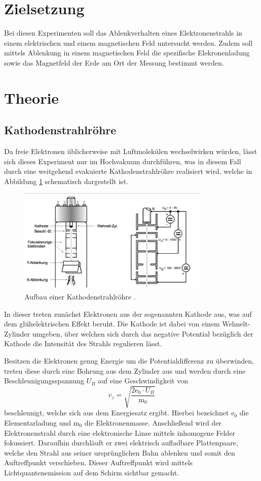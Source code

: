 \section{Zielsetzung}
Bei diesen Experimenten soll das Ablenkverhalten eines Elektronenstrahls in einem
elektrischen und einem magnetischen Feld untersucht werden.
Zudem soll mittels Ablenkung in einem magnetischen Feld die spezifische Elekronenladung
sowie das Magnetfeld der Erde am Ort der Messung bestimmt werden.
\section{Theorie}
\subsection{Kathodenstrahlröhre}
Da freie Elektronen üblicherweise mit Luftmolekülen wechselwirken würden, lässt sich
dieses Experiment nur im Hochvakuum durchführen, was in diesem Fall durch eine weitgehend
evakuierte Kathodenstrahlröhre realisiert wird, welche in Abbildung \ref{fig:rohr} schematisch dargestellt
ist.
\begin{figure}[H]
  \centering
  \includegraphics[height=5cm]{Rohr.png}
  \caption{Aufbau einer Kathodenstrahlröhre \cite{skript1}.}
  \label{fig:rohr}
\end{figure}
In dieser treten zunächst Elektronen aus der sogenannten Kathode aus, was auf dem glühelektrischen
Effekt beruht. Die Kathode ist dabei von einem  Wehnelt-Zylinder umgeben, über welchen
sich durch das negative Potential bezüglich der Kathode die Intensität des Strahls regulieren lässt.

Besitzen die Elektronen genug Energie um die Potentialdifferenz zu
überwinden, treten diese durch eine Bohrung aus dem Zylinder aus und werden durch eine
Beschleunigungsspannung $ U_B $ auf eine Geschwindigkeit von
\begin{equation}
  v_z = \sqrt{\frac{2 \text{e}_0 \cdot U_B }{\text{m}_0}}
  \label{eqn:geschwindigkeit}
\end{equation}
beschleunigt, welche sich aus dem Energiesatz ergibt. Hierbei bezeichnet $\text{e}_0$
die Elementarladung und $\text{m}_0$ die Elektronenmasse.
Anschließend wird der Elektronenstrahl durch eine elektronische Linse mittels inhomogene
Felder fokussiert.
Daraufhin durchläuft er zwei elektrisch aufladbare Plattenpaare, welche den Strahl aus
seiner ursprünglichen Bahn ablenken und somit den Auftreffpunkt verschieben.
Dieser Auftreffpunkt wird mittels Lichtquantenemission auf dem Schirm sichtbar gemacht.

